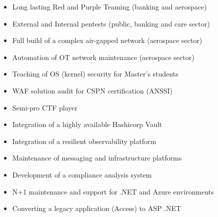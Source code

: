 \documentclass[10pt,a4paper,ragged2e,withhyper]{altacv}
\begin{document}
\begin{paracol}{2}

\begin{itemize}
  \item Long lasting Red and Purple Teaming (banking and aerospace)
  \item External and Internal pentests (public, banking and care sector)
  \item Full build of a complex air-gapped network (aerospace sector)
  \item Automation of OT network maintenance (aerospace sector)
  \item Teaching of OS (kernel) security for Master's students
  \item WAF solution audit for CSPN certification (ANSSI)
  \item Semi-pro CTF player
\end{itemize}

\divider

\begin{itemize}
  \item Integration of a highly available Hashicorp Vault
  \item Integration of a resilient observability platform
  \item Maintenance of messaging and infrastructure platforms
\end{itemize}

\divider

\begin{itemize}
  \item Development of a compliance analysis system
  \item N+1 maintenance and support for .NET and Azure environments
\end{itemize}

\divider

\begin{itemize}
  \item Converting a legacy application (Access) to ASP .NET
\end{itemize}


\end{paracol}
\end{document}
